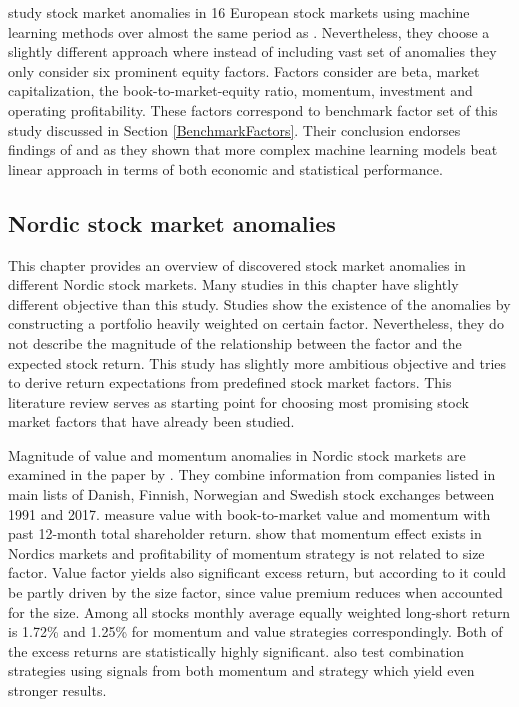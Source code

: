 \documentclass[12pt]{article}
\begin{document}
\citet*{Fieberg} study stock market anomalies in 16 European stock markets using machine learning methods over almost the same period as \citet{Drobetz}\footnotemark. Nevertheless, they choose a slightly different approach where instead of including vast set of anomalies they only consider six prominent equity factors. Factors \citeauthor{Fieberg} consider are beta, market capitalization, the book-to-market-equity ratio, momentum, investment and operating profitability. These factors correspond to benchmark factor set of this study discussed in Section \ref{BenchmarkFactors}. Their conclusion endorses findings of \citet{Drobetz} and \citet{TOBEK2021100588} as they shown that more complex machine learning models beat linear approach in terms of both economic and statistical performance. \par


\subsection{Nordic stock market anomalies}\label{NordicStockMarketAnomalies}

This chapter provides an overview of discovered stock market anomalies in different Nordic stock markets. Many studies in this chapter have slightly different objective than this study. Studies show the existence of the anomalies by constructing a portfolio heavily weighted on certain factor. Nevertheless, they do not describe the magnitude of the relationship between the factor and the expected stock return. This study has slightly more ambitious objective and tries to derive return expectations from predefined stock market factors. This literature review serves as starting point for choosing most promising stock market factors that have already been studied. \par

Magnitude of value and momentum anomalies in Nordic stock markets are examined in the paper by \citet{grobys}. They combine information from companies listed in main lists of Danish, Finnish, Norwegian and Swedish stock exchanges between 1991 and 2017. \citeauthor{grobys} measure value with book-to-market value and momentum with past 12-month total shareholder return. \citeauthor{grobys} show that momentum effect exists in Nordics markets and profitability of momentum strategy is not related to size factor. Value factor yields also significant excess return, but according to \citeauthor{grobys} it could be partly driven by the size factor, since value premium reduces when accounted for the size. Among all stocks monthly average equally weighted long-short return is 1.72\% and 1.25\% for momentum and value strategies correspondingly. Both of the excess returns are statistically highly significant. \citeauthor{grobys} also test combination strategies using signals from both momentum and strategy which yield even stronger results. \par
\end{document}
